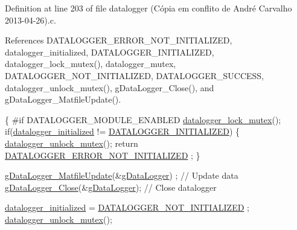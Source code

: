 Definition at line 203 of file datalogger (\-Cópia em conflito de André Carvalho 2013-\/04-\/26).\-c.



References D\-A\-T\-A\-L\-O\-G\-G\-E\-R\-\_\-\-E\-R\-R\-O\-R\-\_\-\-N\-O\-T\-\_\-\-I\-N\-I\-T\-I\-A\-L\-I\-Z\-E\-D, datalogger\-\_\-initialized, D\-A\-T\-A\-L\-O\-G\-G\-E\-R\-\_\-\-I\-N\-I\-T\-I\-A\-L\-I\-Z\-E\-D, datalogger\-\_\-lock\-\_\-mutex(), datalogger\-\_\-mutex, D\-A\-T\-A\-L\-O\-G\-G\-E\-R\-\_\-\-N\-O\-T\-\_\-\-I\-N\-I\-T\-I\-A\-L\-I\-Z\-E\-D, D\-A\-T\-A\-L\-O\-G\-G\-E\-R\-\_\-\-S\-U\-C\-C\-E\-S\-S, datalogger\-\_\-unlock\-\_\-mutex(), g\-Data\-Logger\-\_\-\-Close(), and g\-Data\-Logger\-\_\-\-Matfile\-Update().


\begin{DoxyCode}
\{
\textcolor{preprocessor}{    #if DATALOGGER\_MODULE\_ENABLED}
\textcolor{preprocessor}{}        \hyperlink{datalogger_01_07Caio-PC's_01conflicted_01copy_012012-11-23_08_8c_a54b06d9395b2e370a5a72beb7f9524b2}{datalogger\_lock\_mutex}();
        \textcolor{keywordflow}{if}(\hyperlink{datalogger_01_07Caio-PC's_01conflicted_01copy_012012-11-23_08_8c_a35e8fbe04b90452afdc3c1be16ff6187}{datalogger\_initialized} != 
      \hyperlink{datalogger_01_07Caio-PC's_01conflicted_01copy_012012-11-23_08_8h_a684c343d340004b77ca2b782934c96ca}{DATALOGGER\_INITIALIZED})
    \{
            \hyperlink{datalogger_01_07Caio-PC's_01conflicted_01copy_012012-11-23_08_8c_a85453211c0c809083c36cc56b275aeeb}{datalogger\_unlock\_mutex}();
        \textcolor{keywordflow}{return} \hyperlink{datalogger_01_07Caio-PC's_01conflicted_01copy_012012-11-23_08_8h_a60df7fe0e61b757ad6a9db106b0eb43e}{DATALOGGER\_ERROR\_NOT\_INITIALIZED}
      ;
    \}

    \hyperlink{gdatalogger_8c_a05dc8ce832b941280d7de26057992640}{gDataLogger\_MatfileUpdate}(&\hyperlink{datalogger_01_07Caio-PC's_01conflicted_01copy_012012-11-23_08_8c_abe3b9c2c4e21e79c7b046b5986d13acc}{gDataLogger})
      ; \textcolor{comment}{// Update data}
    \hyperlink{gdatalogger_8c_a0ac95f84c6ee484c4ad0351530f1c468}{gDataLogger\_Close}(&\hyperlink{datalogger_01_07Caio-PC's_01conflicted_01copy_012012-11-23_08_8c_abe3b9c2c4e21e79c7b046b5986d13acc}{gDataLogger}); \textcolor{comment}{// Close
       datalogger}

    \hyperlink{datalogger_01_07Caio-PC's_01conflicted_01copy_012012-11-23_08_8c_a35e8fbe04b90452afdc3c1be16ff6187}{datalogger\_initialized} = \hyperlink{datalogger_01_07Caio-PC's_01conflicted_01copy_012012-11-23_08_8h_a4602a65fdfa920dfe832cfa50b7ee4c8}{DATALOGGER\_NOT\_INITIALIZED}
      ;
    \hyperlink{datalogger_01_07Caio-PC's_01conflicted_01copy_012012-11-23_08_8c_a85453211c0c809083c36cc56b275aeeb}{datalogger\_unlock\_mutex}();


\end{DoxyCode}
